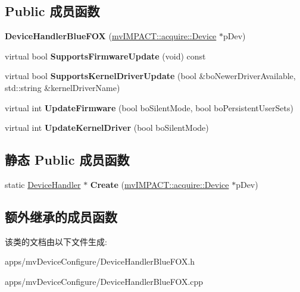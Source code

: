 \subsection*{Public 成员函数}
\begin{DoxyCompactItemize}
\item 
\hypertarget{class_device_handler_blue_f_o_x_a7415a3fe82a015b46efb473a68497636}{{\bfseries Device\+Handler\+Blue\+F\+O\+X} (\hyperlink{classmv_i_m_p_a_c_t_1_1acquire_1_1_device}{mv\+I\+M\+P\+A\+C\+T\+::acquire\+::\+Device} $\ast$p\+Dev)}\label{class_device_handler_blue_f_o_x_a7415a3fe82a015b46efb473a68497636}

\item 
\hypertarget{class_device_handler_blue_f_o_x_a56019dff9d2c8d5af075b99c239876ff}{virtual bool {\bfseries Supports\+Firmware\+Update} (void) const }\label{class_device_handler_blue_f_o_x_a56019dff9d2c8d5af075b99c239876ff}

\item 
\hypertarget{class_device_handler_blue_f_o_x_a4bfa1c663475ddf5369fba9479100bc0}{virtual bool {\bfseries Supports\+Kernel\+Driver\+Update} (bool \&bo\+Newer\+Driver\+Available, std\+::string \&kernel\+Driver\+Name)}\label{class_device_handler_blue_f_o_x_a4bfa1c663475ddf5369fba9479100bc0}

\item 
\hypertarget{class_device_handler_blue_f_o_x_a46eb9ac585818f54808bc506fd2654bf}{virtual int {\bfseries Update\+Firmware} (bool bo\+Silent\+Mode, bool bo\+Persistent\+User\+Sets)}\label{class_device_handler_blue_f_o_x_a46eb9ac585818f54808bc506fd2654bf}

\item 
\hypertarget{class_device_handler_blue_f_o_x_a37ba92326ce2fe8f85be07547b4c8bcc}{virtual int {\bfseries Update\+Kernel\+Driver} (bool bo\+Silent\+Mode)}\label{class_device_handler_blue_f_o_x_a37ba92326ce2fe8f85be07547b4c8bcc}

\end{DoxyCompactItemize}
\subsection*{静态 Public 成员函数}
\begin{DoxyCompactItemize}
\item 
\hypertarget{class_device_handler_blue_f_o_x_ac132e8294ee9028f089439ca476afbb5}{static \hyperlink{class_device_handler}{Device\+Handler} $\ast$ {\bfseries Create} (\hyperlink{classmv_i_m_p_a_c_t_1_1acquire_1_1_device}{mv\+I\+M\+P\+A\+C\+T\+::acquire\+::\+Device} $\ast$p\+Dev)}\label{class_device_handler_blue_f_o_x_ac132e8294ee9028f089439ca476afbb5}

\end{DoxyCompactItemize}
\subsection*{额外继承的成员函数}


该类的文档由以下文件生成\+:\begin{DoxyCompactItemize}
\item 
apps/mv\+Device\+Configure/Device\+Handler\+Blue\+F\+O\+X.\+h\item 
apps/mv\+Device\+Configure/Device\+Handler\+Blue\+F\+O\+X.\+cpp\end{DoxyCompactItemize}
